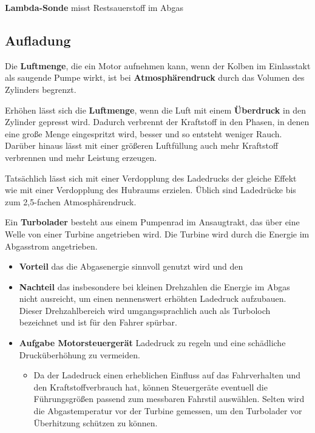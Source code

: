 \textbf{Lambda-Sonde} misst Restsauerstoff im Abgas

\newpage

\subsection{Aufladung}\label{aufladung}

Die \textbf{Luftmenge}, die ein Motor aufnehmen kann, wenn der Kolben im
Einlasstakt als saugende Pumpe wirkt, ist bei \textbf{Atmosphärendruck}
durch das Volumen des Zylinders begrenzt.

Erhöhen lässt sich die \textbf{Luftmenge}, wenn die Luft mit einem
\textbf{Überdruck} in den Zylinder gepresst wird. Dadurch verbrennt der
Kraftstoff in den Phasen, in denen eine große Menge eingespritzt wird,
besser und so entsteht weniger Rauch. Darüber hinaus lässt mit einer
größeren Luftfüllung auch mehr Kraftstoff verbrennen und mehr Leistung
erzeugen.

Tatsächlich lässt sich mit einer Verdopplung des Ladedrucks der gleiche
Effekt wie mit einer Verdopplung des Hubraums erzielen. Üblich sind
Ladedrücke bis zum 2,5-fachen Atmosphärendruck.

Ein \textbf{Turbolader} besteht aus einem Pumpenrad im Ansaugtrakt, das
über eine Welle von einer Turbine angetrieben wird. Die Turbine wird
durch die Energie im Abgasstrom angetrieben.

\begin{itemize}
\item
  \textbf{Vorteil} das die Abgasenergie sinnvoll genutzt wird und den
\item
  \textbf{Nachteil} das insbesondere bei kleinen Drehzahlen die Energie
  im Abgas nicht ausreicht, um einen nennenswert erhöhten Ladedruck
  aufzubauen. Dieser Drehzahlbereich wird umgangssprachlich auch als
  Turboloch bezeichnet und ist für den Fahrer spürbar.
\item
  \textbf{Aufgabe Motorsteuergerät} Ladedruck zu regeln und eine
  schädliche Drucküberhöhung zu vermeiden.

  \begin{itemize}
  \item
    Da der Ladedruck einen erheblichen Einfluss auf das Fahrverhalten
    und den Kraftstoffverbrauch hat, können Steuergeräte eventuell die
    Führungsgrößen passend zum messbaren Fahrstil auswählen. Selten wird
    die Abgastemperatur vor der Turbine gemessen, um den Turbolader vor
    Überhitzung schützen zu können.
  \end{itemize}
\end{itemize}

